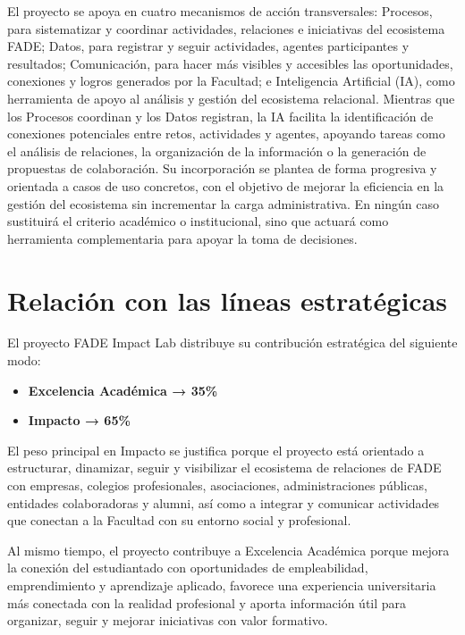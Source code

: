 \documentclass[11pt,a4paper]{scrreprt}
\begin{document}
El proyecto se apoya en cuatro mecanismos de acción transversales: Procesos, para sistematizar y coordinar actividades, relaciones e iniciativas del ecosistema FADE; Datos, para registrar y seguir actividades, agentes participantes y resultados; Comunicación, para hacer más visibles y accesibles las oportunidades, conexiones y logros generados por la Facultad; e Inteligencia Artificial (IA), como herramienta de apoyo al análisis y gestión del ecosistema relacional. Mientras que los Procesos coordinan y los Datos registran, la IA facilita la identificación de conexiones potenciales entre retos, actividades y agentes, apoyando tareas como el análisis de relaciones, la organización de la información o la generación de propuestas de colaboración. Su incorporación se plantea de forma progresiva y orientada a casos de uso concretos, con el objetivo de mejorar la eficiencia en la gestión del ecosistema sin incrementar la carga administrativa. En ningún caso sustituirá el criterio académico o institucional, sino que actuará como herramienta complementaria para apoyar la toma de decisiones.

\section{Relación con las líneas estratégicas}

\small
El proyecto FADE Impact Lab distribuye su contribución estratégica del siguiente modo:

\begin{itemize}[noitemsep,topsep=2pt]
\item \textbf{Excelencia Académica → 35\%}
\item \textbf{Impacto → 65\%}
\end{itemize}

El peso principal en Impacto se justifica porque el proyecto está orientado a estructurar, dinamizar, seguir y visibilizar el ecosistema de relaciones de FADE con empresas, colegios profesionales, asociaciones, administraciones públicas, entidades colaboradoras y alumni, así como a integrar y comunicar actividades que conectan a la Facultad con su entorno social y profesional.

Al mismo tiempo, el proyecto contribuye a Excelencia Académica porque mejora la conexión del estudiantado con oportunidades de empleabilidad, emprendimiento y aprendizaje aplicado, favorece una experiencia universitaria más conectada con la realidad profesional y aporta información útil para organizar, seguir y mejorar iniciativas con valor formativo.
\end{document}
